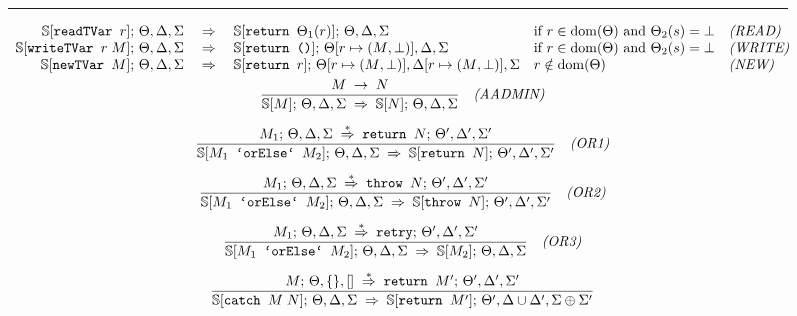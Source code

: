 \begin{figure*}
{\begin{minipage}{\textwidth}
\rule{0.95\linewidth}{0.5pt}

\begin{gather*}
\begin{array}{rclll}
%
   \SS[\prg{readTVar } r];\,\Theta,\Delta\new{,\Sigma}
 & \tdarrow
 & \SS[\prg{return }\Theta_1(r)];\,\Theta,\Delta\new{,\Sigma}
 & \textrm{if $r\in \dom(\Theta)$ \new{and $\Theta_2(s) = \bot$}}
 & \soslbl{READ} \\
%
   \SS[\prg{writeTVar } r\;M];\,\Theta,\Delta\new{,\Sigma}
 & \tdarrow
 & \SS[\prg{return ()}];\,\Theta[r\mapsto \new{(}M\new{,\bot)}],\Delta\new{,\Sigma}
 & \textrm{if $r\in \dom(\Theta)$ \new{and $\Theta_2(s) = \bot$}}
 & \soslbl{WRITE} \\
%
   \SS[\prg{newTVar } M];\,\Theta,\Delta\new{,\Sigma}
 & \tdarrow
 & \SS[\prg{return }r];\,\Theta[r\mapsto \new{(}M\new{,\bot)}],\Delta[r\mapsto \new{(}M\new{,\bot)}]\new{,\Sigma}
 & \textrm{$r\notin \dom(\Theta)$}
 & \soslbl{NEW} \\
%
\end{array}
%
\\
\sos{M \tarrow N}
    {\SS[M];\,\Theta,\Delta\new{,\Sigma} \tdarrow \SS[N];\,\Theta,\Delta\new{,\Sigma}}
    \quad\soslbl{AADMIN}
\\[5pt]
\sos{M_1;\,\Theta,\Delta\new{,\Sigma} \stackrel{*}{\tdarrow} 
      \prg{return }N;\,\Theta',\Delta'\new{,\Sigma'}}
      {\SS[M_1 \prg{ `orElse` } M_2];\,\Theta,\Delta\new{,\Sigma} \tdarrow 
      \SS[\prg{return }N];\,\Theta',\Delta'\new{,\Sigma'}} 
    \quad\soslbl{OR1}
\\[5pt]
\sos{M_1;\,\Theta,\Delta\new{,\Sigma} \stackrel{*}{\tdarrow} 
      \prg{throw }N;\,\Theta',\Delta'\new{,\Sigma'}}
      {\SS[M_1 \prg{ `orElse` } M_2];\,\Theta,\Delta\new{,\Sigma} \tdarrow 
      \SS[\prg{throw }N];\,\Theta',\Delta'\new{,\Sigma'}} 
    \quad\soslbl{OR2}
\\[5pt]
\sos{M_1;\,\Theta,\Delta\new{,\Sigma} \stackrel{*}{\tdarrow} 
      \prg{retry};\,\Theta',\Delta'\new{,\Sigma'}}
      {\SS[M_1 \prg{ `orElse` } M_2];\,\Theta,\Delta\new{,\Sigma} \tdarrow 
      \SS[M_2];\,\Theta,\Delta\new{,\Sigma}} 
    \quad\soslbl{OR3}
\\[5pt]
%
%
\sos{M;\,\Theta,\emptyset\new{,[]}
     \stackrel{*}{\tdarrow}
     \prg{return }M';\, \Theta', \Delta'\new{,\Sigma'}}
    {\SS[\prg{catch }M\;N];\,\Theta,\Delta\new{,\Sigma} \tdarrow
     \SS[\prg{return }M'];\, \Theta',\Delta\cup\Delta'\new{,\Sigma\oplus\Sigma'}}

\end{gather*}
\end{minipage}}
\end{figure*}
